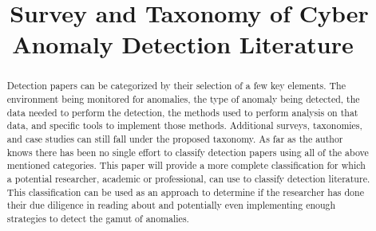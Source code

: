 \documentclass[10pt]{IEEEtran}
\begin{document}
\title{Survey and Taxonomy of Cyber Anomaly Detection Literature\
}

\author{
}

\maketitle

\begin{abstract}
Detection papers can be categorized by their selection of a few key elements. The environment being monitored for anomalies, the type of anomaly being detected, the data needed to perform the detection, the methods used to perform analysis on that data, and specific tools to implement those methods. Additional surveys, taxonomies, and case studies can still fall under the proposed taxonomy. As far as the author knows there has been no single effort to classify detection papers using all of the above mentioned categories. This paper will provide a more complete classification for which a potential researcher, academic or professional, can use to classify detection literature. This classification can be used as an approach to determine if the researcher has done their due diligence in reading about and potentially even implementing enough strategies to detect the gamut of anomalies. 
\end{abstract}
\end{document}

